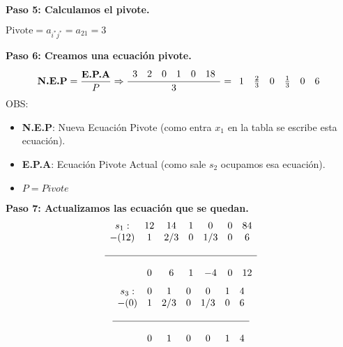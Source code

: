 \documentclass{templateNote}
\begin{document}
\textbf{Paso 5: Calculamos el pivote.}
\begin{center}
    $\text{Pivote} = a_{i^*j^*} = a_{21} = 3$
\end{center}

\textbf{Paso 6: Creamos una ecuación pivote.}
\begin{equation*}
    \textbf{N.E.P} = \frac{\textbf{E.P.A}}{P} \\
    \Rightarrow \frac{\begin{array}{cccccc} 3 & 2 & 0 & 1 & 0 & 18\end{array}}{3} = \begin{array}{cccccc} 1 & \frac{2}{3} & 0 & \frac{1}{3} & 0 & 6\end{array}
\end{equation*}
OBS:
\begin{itemize}
    \item \textbf{N.E.P}: Nueva Ecuación Pivote (como entra $x_1$ en la tabla se escribe esta ecuación).
    \item \textbf{E.P.A}: Ecuación Pivote Actual (como sale $s_2$ ocupamos esa ecuación).
    \item $P = Pivote$
\end{itemize}

\textbf{Paso 7: Actualizamos las ecuación que se quedan.}
\begin{equation*}
    \begin{array}{ccccccc}
        s_1: & 12 & 14 & 1 & 0 & 0 & 84 \\
        -(12) & 1 & 2/3 & 0 & 1/3 & 0 & 6 \\
        \\ \hline \\
        & 0 & 6 & 1 & -4 & 0 & 12 
    \end{array}
\end{equation*}
\vspace{0.5cm}
\begin{equation*}
    \begin{array}{ccccccc}
        s_3: & 0 & 1 & 0 & 0 & 1 & 4 \\
        -(0) & 1 & 2/3 & 0 & 1/3 & 0 & 6 \\
        \\ \hline \\
        & 0 & 1 & 0 & 0 & 1 & 4 
    \end{array}
\end{equation*}
\end{document}
